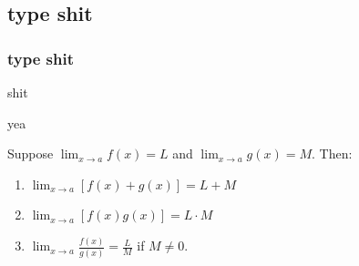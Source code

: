 \documentclass{article}
\begin{document}
\subsection{type shit}
\subsubsection{type shit}

shit

yea

Suppose \( \lim_{x \to a} f(x) = L \) and \( \lim_{x \to a} g(x) = M \). Then:
\begin{enumerate}
	\item \( \lim_{x \to a} [f(x) + g(x)] = L + M \)
	\item \( \lim_{x \to a} [f(x) g(x)] = L \cdot M \)
	\item \( \lim_{x \to a} \frac{f(x)}{g(x)} = \frac{L}{M} \) if \( M \neq 0 \).
\end{enumerate}
\end{document}
